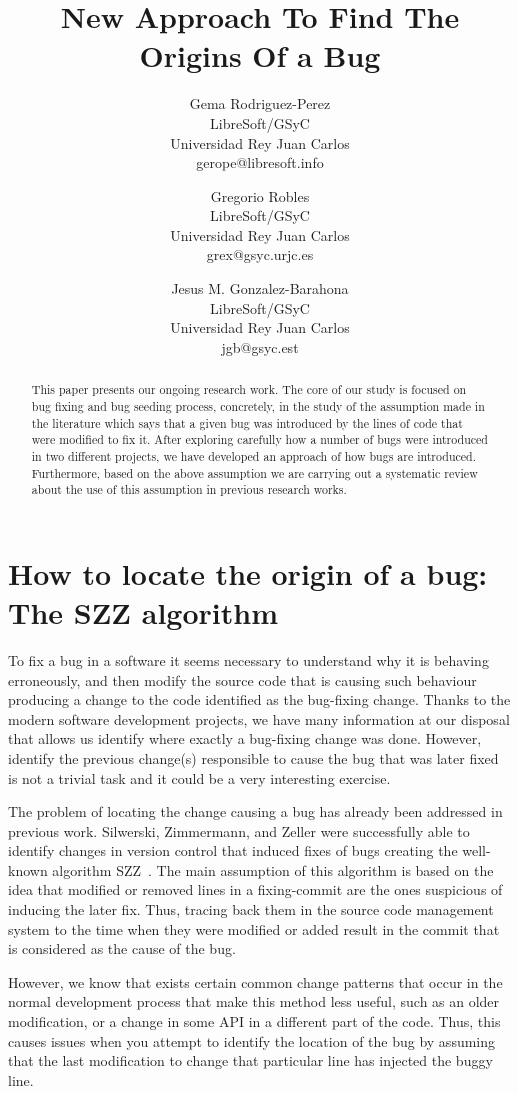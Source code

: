\documentclass[a4paper]{article}
\title{New Approach To Find The Origins Of a Bug }
\author{
Gema Rodriguez-Perez \\ LibreSoft/GSyC\\
                Universidad Rey Juan Carlos \\ gerope@libresoft.info
\and
Gregorio Robles \\ LibreSoft/GSyC\\
                Universidad Rey Juan Carlos \\ grex@gsyc.urjc.es
\and
Jesus M. Gonzalez-Barahona \\LibreSoft/GSyC\\
                Universidad Rey Juan Carlos \\ jgb@gsyc.est
}
\begin{document}
\maketitle

\begin{abstract}

This paper presents our ongoing research work. The core of our study is focused on bug fixing and bug seeding process, concretely, in the study of the assumption made in the literature which says that a given bug was introduced by the lines of code that were modified to fix it. After exploring carefully how a number of bugs were introduced in two different projects, we have developed an approach of how bugs are introduced. Furthermore, based on the above assumption we are carrying out a systematic review about the use of this assumption in previous research works.

\end{abstract}


\section{How to locate the origin of a bug: The SZZ algorithm}

To fix a bug in a software it seems necessary to understand why it is behaving erroneously, and then modify the source code that is causing such behaviour producing a change to the code identified as the bug-fixing change. Thanks to the modern software development projects, we have many information at our disposal that allows us identify where exactly a bug-fixing change was done. However, identify the previous change(s) responsible to cause the bug that was later fixed is not a trivial task and it could be a very interesting exercise.

The problem of locating the change causing a bug has already been addressed in previous work. Silwerski, Zimmermann, and Zeller were successfully able to identify changes in version control that induced fixes of bugs creating the well-known algorithm SZZ~\cite{sliwerski2005changes}. The main assumption of this algorithm is based on the idea that modified or removed lines in a fixing-commit are the ones suspicious of inducing the later fix. Thus, tracing back them in the source code management system to the time when they were modified or added result in the commit that is considered as the cause of the bug.

However, we know that exists certain common change patterns that occur in the normal development process that make this method less useful, such as an older modification, or a change in some API in a different part of the code. Thus, this causes issues when you attempt to identify the location of the bug by assuming that the last modification to change that particular line has injected the buggy line.
\end{document}
